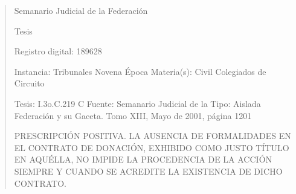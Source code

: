 \documentclass[11pt,a4paper]{article}
\begin{document}
\begin{quote}
                                                   Semanario Judicial de la Federación

                                                  Tesis

 Registro digital: 189628

 Instancia: Tribunales            Novena Época                           Materia(s): Civil
 Colegiados de Circuito

 Tesis: I.3o.C.219 C              Fuente: Semanario Judicial de la       Tipo: Aislada
                                  Federación y su Gaceta.
                                  Tomo XIII, Mayo de 2001, página
                                  1201


PRESCRIPCIÓN POSITIVA. LA AUSENCIA DE FORMALIDADES EN EL CONTRATO DE
DONACIÓN, EXHIBIDO COMO JUSTO TÍTULO EN AQUÉLLA, NO IMPIDE LA PROCEDENCIA
DE LA ACCIÓN SIEMPRE Y CUANDO SE ACREDITE LA EXISTENCIA DE DICHO CONTRATO.



\end{quote}
\end{document}
